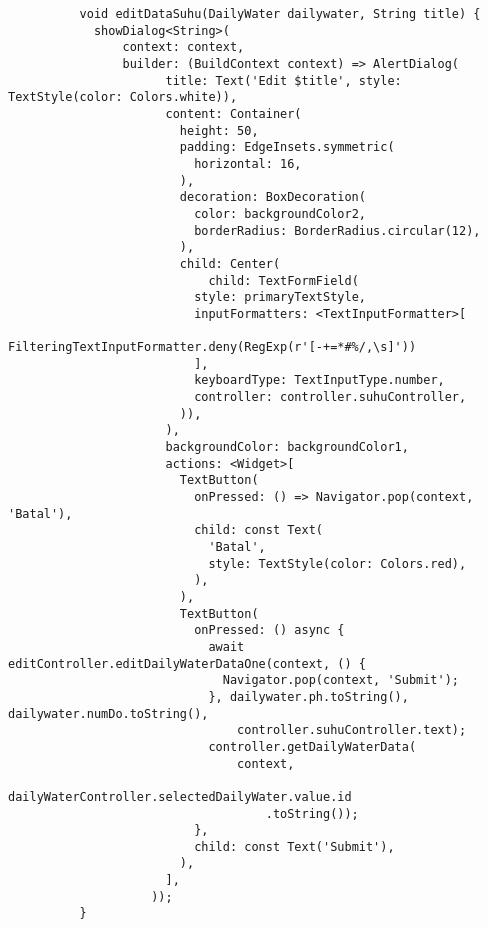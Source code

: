 \begin{lstlisting}
          void editDataSuhu(DailyWater dailywater, String title) {
            showDialog<String>(
                context: context,
                builder: (BuildContext context) => AlertDialog(
                      title: Text('Edit $title', style: TextStyle(color: Colors.white)),
                      content: Container(
                        height: 50,
                        padding: EdgeInsets.symmetric(
                          horizontal: 16,
                        ),
                        decoration: BoxDecoration(
                          color: backgroundColor2,
                          borderRadius: BorderRadius.circular(12),
                        ),
                        child: Center(
                            child: TextFormField(
                          style: primaryTextStyle,
                          inputFormatters: <TextInputFormatter>[
                            FilteringTextInputFormatter.deny(RegExp(r'[-+=*#%/,\s]'))
                          ],
                          keyboardType: TextInputType.number,
                          controller: controller.suhuController,
                        )),
                      ),
                      backgroundColor: backgroundColor1,
                      actions: <Widget>[
                        TextButton(
                          onPressed: () => Navigator.pop(context, 'Batal'),
                          child: const Text(
                            'Batal',
                            style: TextStyle(color: Colors.red),
                          ),
                        ),
                        TextButton(
                          onPressed: () async {
                            await editController.editDailyWaterDataOne(context, () {
                              Navigator.pop(context, 'Submit');
                            }, dailywater.ph.toString(), dailywater.numDo.toString(),
                                controller.suhuController.text);
                            controller.getDailyWaterData(
                                context,
                                dailyWaterController.selectedDailyWater.value.id
                                    .toString());
                          },
                          child: const Text('Submit'),
                        ),
                      ],
                    ));
          }
        

\end{lstlisting}
